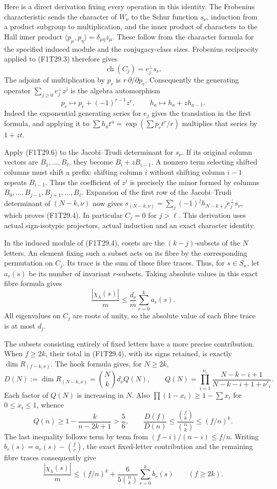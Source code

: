 Here is a direct derivation fixing every operation in this identity.
The Frobenius characteristic sends the character of $W_\nu$
to the Schur function $s_\nu$, induction from a product subgroup
to multiplication, and the inner product of characters to the
Hall inner product
$\langle p_\mu,p_\eta\rangle=\delta_{\mu\eta}z_\mu$.
These follow from the character formula for the specified
induced module and the conjugacy-class sizes.
Frobenius reciprocity applied to (F1T29.3) therefore gives
\[
                  \operatorname{ch}(C_j)=e_j^\perp s_\nu .
 \tag{F1T29.5}
\]
The adjoint of multiplication by $p_r$ is
$r\,\partial/\partial p_r$. Consequently the generating
operator $\sum_{j\ge0}e_j^\perp z^j$ is the algebra
automorphism
\[
          p_r\longmapsto p_r+(-1)^{r-1}z^r,
      \qquad h_a\longmapsto h_a+z h_{a-1}.
 \tag{F1T29.6}
\]
Indeed the exponential generating series for $e_j$ gives
the translation in the first formula, and applying it to
$\sum h_a t^a=\exp(\sum p_rt^r/r)$ multiplies that series
by $1+zt$.

Apply (F1T29.6) to the Jacobi--Trudi determinant for $s_\nu$.
If its original column vectors are $B_1,\ldots,B_\ell$,
they become $B_i+zB_{i-1}$. A nonzero term selecting
shifted columns must shift a prefix: shifting column $i$
without shifting column $i-1$ repeats $B_{i-1}$.
Thus the coefficient of $z^j$ is precisely the minor
formed by columns $B_0,\ldots,B_{j-1},B_{j+1},\ldots,B_\ell$.
Expansion of the first row of the Jacobi--Trudi
determinant of $(N-k,\nu)$ now gives
$s_{(N-k,\nu)}=\sum_j(-1)^jh_{N-k+j}e_j^\perp s_\nu$,
which proves (F1T29.4). In particular $C_j=0$ for $j>\ell$.
This derivation uses actual sign-isotypic projectors,
actual induction and an exact character identity.

In the induced module of (F1T29.4), cosets are the
$(k-j)$-subsets of the $N$ letters. An element fixing
such a subset acts on its fibre by the corresponding
permutation on $C_j$. Its trace is the sum of these
fibre traces. Thus, for $s\in S_n$, let $a_r(s)$ be its
number of invariant $r$-subsets. Taking absolute values
in this exact fibre formula gives
\[
             \frac{|\chi_\lambda(s)|}{m}
           \le \frac{d_\nu}{m}\sum_{r=0}^k a_r(s).
 \tag{F1T29.7}
\]
All eigenvalues on $C_j$ are roots of unity, so the
absolute value of each fibre trace is at most $d_j$.

The subsets consisting entirely of fixed letters have a
more precise contribution. When $f\ge2k$, their total
in (F1T29.4), with its signs retained, is exactly
$\dim R_{(f-k,\nu)}$. The hook formula gives, for $N\ge2k$,
\[
 D(N):=\dim R_{(N-k,\nu)}
  =\binom Nk d_\nu Q(N),\qquad
 Q(N)=\prod_{i=1}^{\nu_1}
       \frac{N-k-i+1}{N-k-i+1+\nu'_i}.
 \tag{F1T29.8}
\]
Each factor of $Q(N)$ is increasing in $N$. Also
$\prod(1-x_i)\ge1-\sum x_i$ for $0\le x_i\le1$, whence
\[
 Q(n)\ge1-\frac{k}{n-2k+1}>\frac56,\qquad
 \frac{D(f)}{D(n)}
       \le\frac{\binom fk}{\binom nk}\le(f/n)^k .
 \tag{F1T29.9}
\]
The last inequality follows term by term from
$(f-i)/(n-i)\le f/n$.
Writing $b_r(s)=a_r(s)-\binom fr$, the exact fixed-letter
contribution and the remaining fibre traces consequently give
\[
 \frac{|\chi_\lambda(s)|}{m}
 \le (f/n)^k+\frac{6}{5\binom nk}\sum_{r=0}^k b_r(s)
                       \qquad(f\ge2k).
 \tag{F1T29.10}
\]

